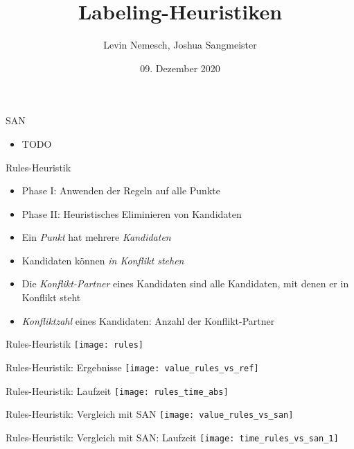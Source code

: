 \documentclass[ngerman,aspectratio=169,10pt]{beamer}
\title{Labeling-Heuristiken}
\date{09. Dezember 2020}
\author{Levin Nemesch, Joshua Sangmeister}
\institute{Algorithm Engineering - Projekt}
\begin{document}
\maketitle

\begin{frame}{SAN}
    \begin{itemize}
        \item TODO
    \end{itemize}
\end{frame}

\begin{frame}{Rules-Heuristik}
    \begin{itemize}
        \item Phase I: Anwenden der Regeln auf alle Punkte
        \item Phase II: Heuristisches Eliminieren von Kandidaten
        \vspace{10px}
        \item Ein \textit{Punkt} hat mehrere \textit{Kandidaten}
        \item Kandidaten können \textit{in Konflikt stehen}
        \item Die \textit{Konflikt-Partner} eines Kandidaten sind alle Kandidaten, mit denen er in Konflikt steht
        \item \textit{Konfliktzahl} eines Kandidaten: Anzahl der Konflikt-Partner
    \end{itemize}
\end{frame}

\begin{frame}{Rules-Heuristik}
    \centering
    \texttt{[image: rules]}
\end{frame}

\begin{frame}{Rules-Heuristik: Ergebnisse}
    \centering
    \texttt{[image: value\_rules\_vs\_ref]}
\end{frame}

\begin{frame}{Rules-Heuristik: Laufzeit}
    \centering
    \texttt{[image: rules\_time\_abs]}
\end{frame}

\begin{frame}{Rules-Heuristik: Vergleich mit SAN}
    \centering
    \texttt{[image: value\_rules\_vs\_san]}
\end{frame}

\begin{frame}{Rules-Heuristik: Vergleich mit SAN: Laufzeit}
    \centering
    \texttt{[image: time\_rules\_vs\_san\_1]}
\end{frame}
\end{document}
